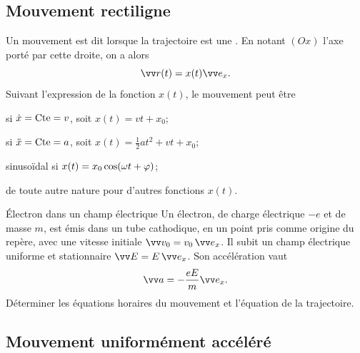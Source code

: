 \documentclass[12pt,fancy]{cours}
\begin{document}
\subsection{Mouvement rectiligne}

Un mouvement est dit  lorsque la trajectoire est une . En notant $(Ox)$ l'axe porté par cette droite, on a alors
\begin{equation}
\Vec{r}(t) = x(t) \ex.
\end{equation}
Suivant l'expression de la fonction $x(t)$, le mouvement peut être
\begin{liste}
  \item {} si $\dot{x} = \text{Cte} =v$, soit $x(t) = v t + x_0$;
  \item {} si $\ddot{x} = \text{Cte} =a$, soit $x(t) = \frac{1}{2} a t^2 + v t + x_0$;
  \item sinusoïdal si $x(t) = x_0 \cos(\omega t + \varphi)$;
  \item de toute autre nature pour d'autres fonctions $x(t)$.
\end{liste}

\begin{exemple}{Électron dans un champ électrique}
Un électron, de charge électrique $-e$ et de masse $m$, est émis dans un tube cathodique, en un point pris comme origine du repère, avec une vitesse initiale  $\Vec{v_0}=v_0\,\ex$. Il subit un champ électrique uniforme et stationnaire $\Vec{E}=E\,\ex$. Son accélération vaut
\begin{equation*}
\Vec{a} = -\dfrac{eE}{m} \ex.
\end{equation*}
Déterminer les équations horaires du mouvement et l'équation de la trajectoire.
\end{exemple}


\subsection{Mouvement uniformément accéléré}
\end{document}
